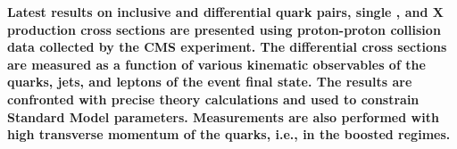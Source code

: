 {\bf
Latest results on inclusive and differential \PQt quark pairs, single \PQt, and {\ttbar}X 
production cross sections are presented using proton-proton collision data collected by the CMS 
experiment. The differential cross sections are measured as a function of various kinematic 
observables of the \PQt quarks, jets, and leptons of the event final state. The results are 
confronted with precise theory calculations and used to constrain Standard Model parameters. 
Measurements are also performed with high transverse momentum of the \PQt quarks, i.e., in the 
boosted regimes.
}
